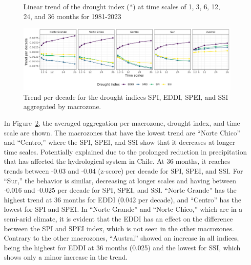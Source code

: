 \documentclass[
  authoryear,
  preprint,
  3p,
  onecolumn]{elsarticle}
\begin{document}
\begin{figure}
\begin{minipage}[t]{0.50\linewidth}
{{}

}

\end{minipage}%

\caption{\label{fig-trendDI}Linear trend of the drought index (*) at
time scales of 1, 3, 6, 12, 24, and 36 months for 1981-2023}

\end{figure}

\elandscape

\begin{figure}[!ht]

{\centering \includegraphics{../output/figs/trend_macrozone_drought_indices.png}

}

\caption{\label{fig-trendDIMacro}Trend per decade for the drought
indices SPI, EDDI, SPEI, and SSI aggregated by macrozone.}

\end{figure}

In Figure~\ref{fig-trendDIMacro}, the averaged aggregation per
macrozone, drought index, and time scale are shown. The macrozones that
have the lowest trend are ``Norte Chico'' and ``Centro,'' where the SPI,
SPEI, and SSI show that it decreases at longer time scales. Potentially
explained due to the prolonged reduction in precipitation that has
affected the hydrological system in Chile. At 36 months, it reaches
trends between -0.03 and -0.04 (z-score) per decade for SPI, SPEI, and
SSI. For ``Sur,'' the behavior is similar, decreasing at longer scales
and having between -0.016 and -0.025 per decade for SPI, SPEI, and SSI.
``Norte Grande'' has the highest trend at 36 months for EDDI (0.042 per
decade), and ``Centro'' has the lowest for SPI and SPEI. In ``Norte
Grande'' and ``Norte Chico,'' which are in a semi-arid climate, it is
evident that the EDDI has an effect on the difference between the SPI
and SPEI index, which is not seen in the other macrozones. Contrary to
the other macrozones, ``Austral'' showed an increase in all indices,
being the highest for EDDI at 36 months (0.025) and the lowest for SSI,
which shows only a minor increase in the trend.
\end{document}
